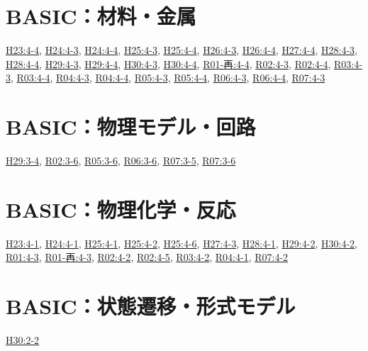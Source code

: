 \section{BASIC：材料・金属}
\hyperref[q:h23-reg-basic-4-4]{H23:4-4}, \hyperref[q:h24-reg-basic-4-3]{H24:4-3}, \hyperref[q:h24-reg-basic-4-4]{H24:4-4}, \hyperref[q:h25-reg-basic-4-3]{H25:4-3}, \hyperref[q:h25-reg-basic-4-4]{H25:4-4}, \hyperref[q:h26-reg-basic-4-3]{H26:4-3}, \hyperref[q:h26-reg-basic-4-4]{H26:4-4}, \hyperref[q:h27-reg-basic-4-4]{H27:4-4}, \hyperref[q:h28-reg-basic-4-3]{H28:4-3}, \hyperref[q:h28-reg-basic-4-4]{H28:4-4}, \hyperref[q:h29-reg-basic-4-3]{H29:4-3}, \hyperref[q:h29-reg-basic-4-4]{H29:4-4}, \hyperref[q:h30-reg-basic-4-3]{H30:4-3}, \hyperref[q:h30-reg-basic-4-4]{H30:4-4}, \hyperref[q:r01-ret-basic-4-4]{R01-再:4-4}, \hyperref[q:r02-reg-basic-4-3]{R02:4-3}, \hyperref[q:r02-reg-basic-4-4]{R02:4-4}, \hyperref[q:r03-reg-basic-4-3]{R03:4-3}, \hyperref[q:r03-reg-basic-4-4]{R03:4-4}, \hyperref[q:r04-reg-basic-4-3]{R04:4-3}, \hyperref[q:r04-reg-basic-4-4]{R04:4-4}, \hyperref[q:r05-reg-basic-4-3]{R05:4-3}, \hyperref[q:r05-reg-basic-4-4]{R05:4-4}, \hyperref[q:r06-reg-basic-4-3]{R06:4-3}, \hyperref[q:r06-reg-basic-4-4]{R06:4-4}, \hyperref[q:r07-reg-basic-4-3]{R07:4-3}
\section{BASIC：物理モデル・回路}
\hyperref[q:h29-reg-basic-3-4]{H29:3-4}, \hyperref[q:r02-reg-basic-3-6]{R02:3-6}, \hyperref[q:r05-reg-basic-3-6]{R05:3-6}, \hyperref[q:r06-reg-basic-3-6]{R06:3-6}, \hyperref[q:r07-reg-basic-3-5]{R07:3-5}, \hyperref[q:r07-reg-basic-3-6]{R07:3-6}
\section{BASIC：物理化学・反応}
\hyperref[q:h23-reg-basic-4-1]{H23:4-1}, \hyperref[q:h24-reg-basic-4-1]{H24:4-1}, \hyperref[q:h25-reg-basic-4-1]{H25:4-1}, \hyperref[q:h25-reg-basic-4-2]{H25:4-2}, \hyperref[q:h25-reg-basic-4-6]{H25:4-6}, \hyperref[q:h27-reg-basic-4-3]{H27:4-3}, \hyperref[q:h28-reg-basic-4-1]{H28:4-1}, \hyperref[q:h29-reg-basic-4-2]{H29:4-2}, \hyperref[q:h30-reg-basic-4-2]{H30:4-2}, \hyperref[q:r01-reg-basic-4-3]{R01:4-3}, \hyperref[q:r01-ret-basic-4-3]{R01-再:4-3}, \hyperref[q:r02-reg-basic-4-2]{R02:4-2}, \hyperref[q:r02-reg-basic-4-5]{R02:4-5}, \hyperref[q:r03-reg-basic-4-2]{R03:4-2}, \hyperref[q:r04-reg-basic-4-1]{R04:4-1}, \hyperref[q:r07-reg-basic-4-2]{R07:4-2}
\section{BASIC：状態遷移・形式モデル}
\hyperref[q:h30-reg-basic-2-2]{H30:2-2}
